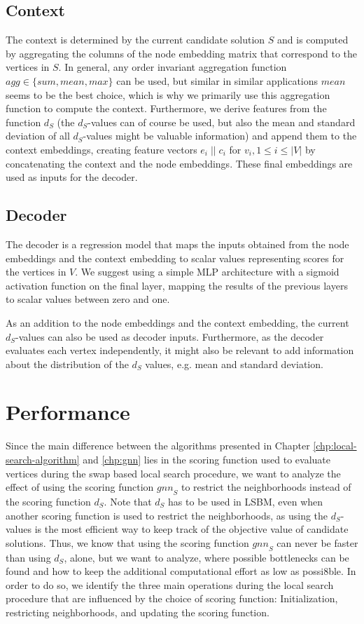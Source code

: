 \documentclass[draft,final]{vutinfth} %
\begin{document}
\subsection{Context}
The context is determined by the current candidate solution $S$ and is computed by aggregating the columns of the node embedding matrix that correspond to the vertices in $S$. In general, any order invariant aggregation function $\mathit{agg} \in \{\mathit{sum, mean, max}\}$ can be used, but similar in similar applications $\mathit{mean}$ seems to be the best choice, which is why we primarily use this aggregation function to compute the context. Furthermore, we derive features from the function $d_S$ (the $d_S$-values can of course be used, but also the mean and standard deviation of all $d_S$-values might be valuable information) and append them to the context embeddings, creating feature vectors $e_i \; || \; c_i$ for $v_i, 1 \leq i \leq |V|$ by concatenating the context and the node embeddings. These final embeddings are used as inputs for the decoder. 

\subsection{Decoder}
The decoder is a regression model that maps the inputs obtained from the node embeddings and the context embedding to scalar values representing scores for the vertices in $V$. We suggest using a simple MLP architecture with a sigmoid activation function on the final layer, mapping the results of the previous layers to scalar values between zero and one. 

As an addition to the node embeddings and the context embedding, the current $d_S$-values can also be used as decoder inputs. Furthermore, as the decoder evaluates each vertex independently, it might also be relevant to add information about the distribution of the $d_S$ values, e.g. mean and standard deviation. 

\section{Performance}\label{sec:performance}

Since the main difference between the algorithms presented in Chapter \ref{chp:local-search-algorithm} and \ref{chp:gnn} lies in the scoring function used to evaluate vertices during the swap based local search procedure, we want to analyze the effect of using the scoring function $\mathit{gnn}_S$ to restrict the neighborhoods instead of the scoring function $d_S$. Note that $d_S$ has to be used in LSBM, even when another scoring function is used to restrict the neighborhoods, as using the $d_S$-values is the most efficient way to keep track of the objective value of candidate solutions. Thus, we know that using the scoring function $\mathit{gnn}_S$ can never be faster than using $d_S$, alone, but we want to analyze, where possible bottlenecks can be found and how to keep the additional computational effort as low as possi8ble.  
In order to do so, we identify the three main operations during the local search procedure that are influenced by the choice of scoring function: Initialization, restricting neighborhoods, and updating the scoring function.  
\end{document}
